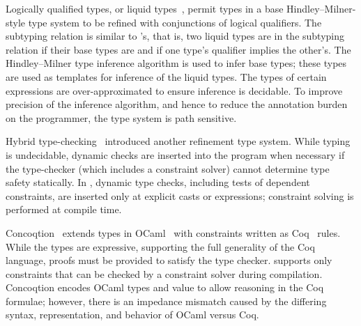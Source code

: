

Logically qualified types, or liquid types~\cite{liquid-types},
permit types in a base Hindley--Milner-style type system to be refined with
conjunctions of logical qualifiers.  The subtyping relation is similar to
\Xten{}'s, that is, two liquid types are in the subtyping relation if their base
types are and if one type's qualifier implies the other's.
The Hindley--Milner type
inference algorithm is used to infer base types; these types are used as templates for inference of the liquid types.
The types of certain expressions are over-approximated to ensure inference
is decidable.
To improve precision of the inference algorithm, and hence
to reduce the annotation burden on the programmer, 
the type system is path sensitive.

Hybrid type-checking~\cite{flanagan-popl06,flanagan-fool06}
introduced another refinement type system.
While typing is undecidable, dynamic checks are inserted into
the program when necessary if the type-checker (which
includes a constraint solver) cannot determine
type safety statically.
In \FXG{}, dynamic type checks, including tests of dependent
constraints, are inserted only at explicit casts or
 expressions; constraint solving is performed at compile time.


Concoqtion~\cite{concoqtion} extends types in OCaml~\cite{ocaml}
with constraints written as Coq~\cite{coq} rules.
While the types are expressive, supporting the full generality
of the Coq language, proofs must be
provided to satisfy the type checker.
\Xten{} supports only constraints that can be checked by a
constraint solver during compilation.
Concoqtion encodes OCaml types and value to allow reasoning in
the Coq formulae; however, there is an impedance mismatch
caused by the differing syntax, representation, and behavior
of OCaml versus Coq.


